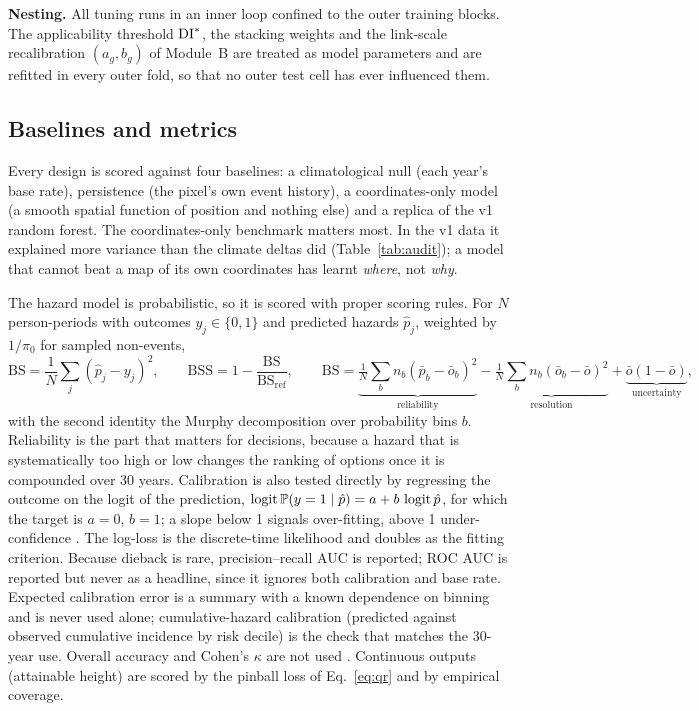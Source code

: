 \textbf{Nesting.} All tuning runs in an inner loop confined to the outer training blocks. The applicability threshold $\mathrm{DI}^\ast$, the stacking weights and the link-scale recalibration $(a_g,b_g)$ of Module~B are treated as model parameters and are refitted in every outer fold, so that no outer test cell has ever influenced them.

\subsection{Baselines and metrics}
Every design is scored against four baselines: a climatological null (each year's base rate), persistence (the pixel's own event history), a coordinates-only model (a smooth spatial function of position and nothing else) and a replica of the v1 random forest. The coordinates-only benchmark matters most. In the v1 data it explained more variance than the climate deltas did (Table~\ref{tab:audit}); a model that cannot beat a map of its own coordinates has learnt \emph{where}, not \emph{why}.

The hazard model is probabilistic, so it is scored with proper scoring rules. For $N$ person-periods with outcomes $y_j\in\{0,1\}$ and predicted hazards $\hat p_j$, weighted by $1/\pi_0$ for sampled non-events,
\begin{equation}\label{eq:brier}
\mathrm{BS}=\frac1N\sum_{j}(\hat p_j-y_j)^2,\qquad \mathrm{BSS}=1-\frac{\mathrm{BS}}{\mathrm{BS}_{\text{ref}}},\qquad
\mathrm{BS}=\underbrace{\tfrac1N\sum_b n_b(\bar p_b-\bar o_b)^2}_{\text{reliability}}-\underbrace{\tfrac1N\sum_b n_b(\bar o_b-\bar o)^2}_{\text{resolution}}+\underbrace{\bar o(1-\bar o)}_{\text{uncertainty}},
\end{equation}
with the second identity the Murphy decomposition over probability bins $b$. Reliability is the part that matters for decisions, because a hazard that is systematically too high or low changes the ranking of options once it is compounded over 30 years. Calibration is also tested directly by regressing the outcome on the logit of the prediction, $\operatorname{logit}\mathbb{P}(y=1\mid\hat p)=a+b\,\operatorname{logit}\hat p$, for which the target is $a=0$, $b=1$; a slope below 1 signals over-fitting, above 1 under-confidence \citep{Steyerberg2010}. The log-loss is the discrete-time likelihood and doubles as the fitting criterion. Because dieback is rare, precision--recall AUC is reported; ROC AUC is reported but never as a headline, since it ignores both calibration and base rate. Expected calibration error is a summary with a known dependence on binning and is never used alone; cumulative-hazard calibration (predicted against observed cumulative incidence by risk decile) is the check that matches the $30$-year use. Overall accuracy and Cohen's $\kappa$ are not used \citep{Pontius2011}. Continuous outputs (attainable height) are scored by the pinball loss of Eq.~\eqref{eq:qr} and by empirical coverage.

